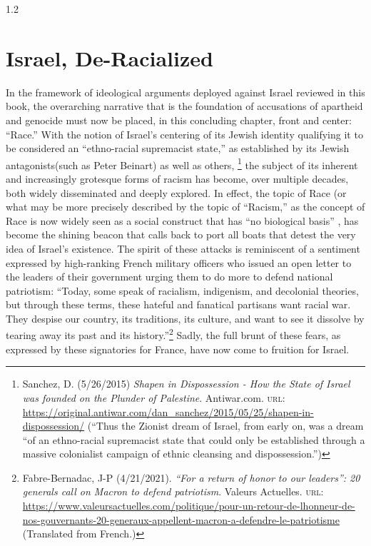 \documentclass[../unravbook.tex]{subfiles}
\begin{document}
\begin{spacing}{1.2}

\setcounter{chapter}{4}
\setcounter{endnote}{0}

\chapter{Israel, De-Racialized} %
    
    
In the framework of ideological arguments deployed against Israel reviewed in this book, the overarching narrative that is the foundation of accusations of apartheid and genocide must now be placed, in this concluding chapter, front and center: ``Race.'' With the notion of Israel's centering of its Jewish identity qualifying it to be considered an \enquote{ethno-racial supremacist state,} as established by its Jewish antagonists(such as Peter Beinart) as well as others, \footnote{Sanchez, D. (5/26/2015) \textit{Shapen in Dispossession - How the State of Israel was founded on the Plunder of Palestine}. Antiwar.com. \textsc{url:} \url{https://original.antiwar.com/dan_sanchez/2015/05/25/shapen-in-dispossession/} (``Thus the Zionist dream of Israel, from early on, was a dream ``of an ethno-racial supremacist state that could only be established through a massive colonialist campaign of ethnic cleansing and dispossession.'')} the subject of its inherent and increasingly grotesque forms of racism has become, over multiple decades, both widely disseminated and deeply explored. In effect, the topic of Race (or what may be more precisely described by the topic of \enquote{Racism,} as the concept of Race is now widely seen as a social construct that has \enquote{no biological basis} \parencite{Sesardic-2010}, has become the shining beacon that calls back to port all boats that detest the very idea of Israel's existence. The spirit of these attacks is reminiscent of a sentiment expressed by high-ranking French military officers who issued an open letter to the leaders of their government urging them to do more to defend national patriotism: ``Today, some speak of racialism, indigenism, and decolonial theories, but through these terms, these hateful and fanatical partisans want racial war. They despise our country, its traditions, its culture, and want to see it dissolve by tearing away its past and its history.''\footnote{Fabre-Bernadac, J-P (4/21/2021). \textit{``For a return of honor to our leaders'': 20 generals call on Macron to defend patriotism}. Valeurs Actuelles. \textsc{url: } \url{https://www.valeursactuelles.com/politique/pour-un-retour-de-lhonneur-de-nos-gouvernants-20-generaux-appellent-macron-a-defendre-le-patriotisme} (Translated from French.)} Sadly, the full brunt of these fears, as expressed by these signatories for France, have now come to fruition for Israel.


\end{spacing}
\end{document}
